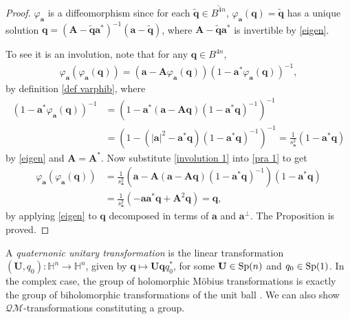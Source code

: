 \documentclass[a4paper,11pt]{amsart}
\numberwithin{equation}{section}
\begin{document}
\begin{proof}
$\varphi_{\mathbf{a}}$ is a diffeomorphism since for each $\widetilde{\mathbf{q}}\in \overline{B^{4n}}$, $\varphi_{\mathbf{a}}(\mathbf{q})=\widetilde{\mathbf{q}}$ has a unique solution $\mathbf{q}=(\mathbf{A}-\widetilde{\mathbf{q}}\mathbf{a}^*)^{-1}(\mathbf{a}-\widetilde{\mathbf{q}})$, where $\mathbf{A}-\widetilde{\mathbf{q}}\mathbf{a}^*$ is invertible by \eqref{eigen}.

  To see it is an involution, note that for any $\mathbf{q}\in B^{4n}$,
\begin{equation}\begin{aligned}\label{pra 1}
\varphi_{\mathbf{a}}(\varphi_{\mathbf{a}}(\mathbf{q}))=(\mathbf{a}-\mathbf{A}\varphi_{\mathbf{a}}(\mathbf{q}))(1-\mathbf{a}^*\varphi_{\mathbf{a}}(\mathbf{q}))^{-1},
\end{aligned}\end{equation}
by definition \eqref{def varphib},
where
\begin{equation}\begin{aligned}\label{involution 1}
(1-\mathbf{a}^*\varphi_{\mathbf{a}}(\mathbf{q}))^{-1}&=(1-\mathbf{a}^*(\mathbf{a}-\mathbf{A}\mathbf{q})(1-\mathbf{a}^*\mathbf{q})^{-1})^{-1}\\
&=(1-(|\mathbf{a}|^2-\mathbf{a}^*\mathbf{q})(1-\mathbf{a}^*\mathbf{q})^{-1})^{-1}=\frac{1}{s_{\mathbf{a}}^2}(1-\mathbf{a}^*\mathbf{q})
  \end{aligned}\end{equation}
by \eqref{eigen} and $\mathbf{A}=\mathbf{A}^*$. Now substitute \eqref{involution 1} into \eqref{pra 1} to get
\begin{equation}\begin{aligned}\label{involution 2}
\varphi_{\mathbf{a}}(\varphi_{\mathbf{a}}(\mathbf{q}))&=\frac{1}{s_{\mathbf{a}}^2}(\mathbf{a}-\mathbf{A}(\mathbf{a}-\mathbf{A}\mathbf{q})(1-\mathbf{a}^*\mathbf{q})^{-1})(1-\mathbf{a}^*\mathbf{q})\\
&=\frac{1}{s_{\mathbf{a}}^2}(-\mathbf{a}\mathbf{a}^*\mathbf{q}+\mathbf{A}^2\mathbf{q})=\mathbf{q},
\end{aligned}\end{equation}
by applying \eqref{eigen} to $\mathbf{q}$ decomposed in terms of $\mathbf{a}$ and $\mathbf{a}^{\bot}$. The Proposition is proved.
\end{proof}

A {\it quaternonic unitary transformation} is the linear transformation $(\mathbf{U},q_0):\mathbb{H}^n \rightarrow \mathbb{H}^n$, given by $\mathbf{q}\mapsto\mathbf{U}\mathbf{q}q_0^{*}$, for some $\mathbf{U}\in {\rm Sp}(n)$ and $q_0\in {\rm Sp}(1)$. In the complex case, the group of holomorphic M\"{o}bius transformations is exactly the group of biholomorphic transformations of the unit ball \cite{Rudin}. We can also show $\mathcal{QM}$-transformations constituting a group.
\end{document}
